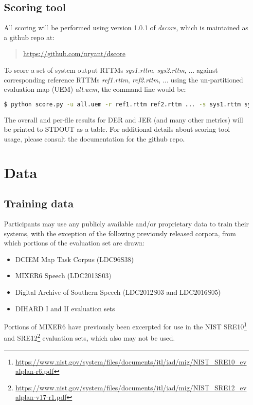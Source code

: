 \documentclass{article}
\begin{document}
\subsection{Scoring tool}
All scoring will be performed using version 1.0.1 of {\it dscore}, which is maintained as a github repo at:
    \begin{quote}
        \url{https://github.com/nryant/dscore}
    \end{quote}
To score a set of system output RTTMs {\it sys1.rttm}, {\it sys2.rttm}, ... against corresponding reference RTTMs {\it ref1.rttm}, {\it ref2.rttm}, ... using the un-partitioned evaluation map (UEM) {\it all.uem}, the command line would be:
\begin{lstlisting}[language=bash]
  $ python score.py -u all.uem -r ref1.rttm ref2.rttm ... -s sys1.rttm sys2.rttm ...
\end{lstlisting}
The overall and per-file results for DER and JER (and many other metrics) will be printed to STDOUT as a table. For additional details about scoring tool usage, please consult the documentation for the github repo.



\section{Data}
\label{sec:data}
\subsection{Training data}
\label{sec:data:train}
Participants may use any publicly available and/or proprietary data to train their systems, with the exception of the following previously released corpora, from which portions of the evaluation set are drawn:
\begin{itemize}
    \item DCIEM Map Task Corpus (LDC96S38)
    \item MIXER6 Speech (LDC2013S03)
    \item Digital Archive of Southern Speech (LDC2012S03 and LDC2016S05)
    \item DIHARD I and II evaluation sets
\end{itemize}
Portions of MIXER6 have previously been excerpted for use in the NIST SRE10\footnote{\url{https://www.nist.gov/system/files/documents/itl/iad/mig/NIST_SRE10_evalplan-r6.pdf}} and SRE12\footnote{\url{https://www.nist.gov/system/files/documents/itl/iad/mig/NIST_SRE12_evalplan-v17-r1.pdf}} evaluation sets, which also may not be used.
\end{document}
